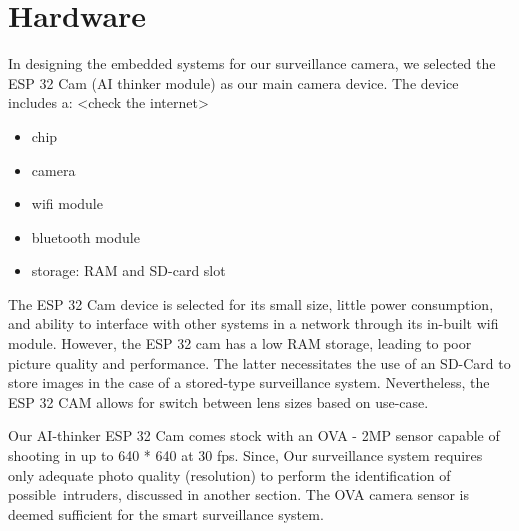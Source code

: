 \documentclass[../../main.tex]{subfiles}
\begin{document}
    \section{Hardware}
        In designing the embedded systems for our surveillance camera, we selected the ESP 32 Cam (AI thinker module) as our main camera device. The device includes a:
        <check the internet>
        \begin{itemize}
            \item chip
            \item camera
            \item wifi module
            \item bluetooth module
            \item storage: RAM and SD-card slot
        \end{itemize}

        The ESP 32 Cam device is selected for its small size, little power consumption, and ability to interface with other systems in a network through its in-built wifi module. However, the ESP 32 cam has a low RAM storage, leading to poor picture quality and performance. The latter necessitates the use of an SD-Card to store images in the case of a stored-type surveillance system. Nevertheless, the ESP 32 CAM allows for switch between lens sizes based on use-case.

        Our AI-thinker ESP 32 Cam comes stock with an OVA - 2MP sensor capable of shooting in up to 640 * 640 at 30 fps. Since, Our surveillance system requires only adequate photo quality (resolution) to perform the identification of possible intruders, discussed in another section. The OVA camera sensor is deemed sufficient for the smart surveillance system.
\end{document}
